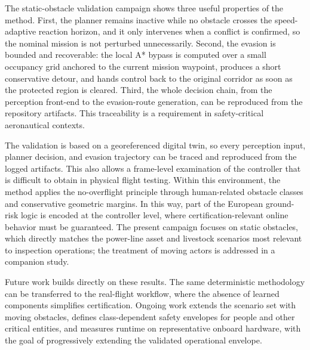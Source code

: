\documentclass[drones,article,submit,moreauthors]{Definitions/mdpi}
\begin{document}
The static-obstacle validation campaign shows three useful properties of the method. First, the planner remains inactive while no obstacle crosses the speed-adaptive reaction horizon, and it only intervenes when a conflict is confirmed, so the nominal mission is not perturbed unnecessarily. Second, the evasion is bounded and recoverable: the local A* bypass is computed over a small occupancy grid anchored to the current mission waypoint, produces a short conservative detour, and hands control back to the original corridor as soon as the protected region is cleared. Third, the whole decision chain, from the perception front-end to the evasion-route generation, can be reproduced from the repository artifacts. This traceability is a requirement in safety-critical aeronautical contexts.

The validation is based on a georeferenced digital twin, so every perception input, planner decision, and evasion trajectory can be traced and reproduced from the logged artifacts. This also allows a frame-level examination of the controller that is difficult to obtain in physical flight testing. Within this environment, the method applies the no-overflight principle through human-related obstacle classes and conservative geometric margins. In this way, part of the European ground-risk logic is encoded at the controller level, where certification-relevant online behavior must be guaranteed. The present campaign focuses on static obstacles, which directly matches the power-line asset and livestock scenarios most relevant to inspection operations; the treatment of moving actors is addressed in a companion study.

Future work builds directly on these results. The same deterministic methodology can be transferred to the real-flight workflow, where the absence of learned components simplifies certification. Ongoing work extends the scenario set with moving obstacles, defines class-dependent safety envelopes for people and other critical entities, and measures runtime on representative onboard hardware, with the goal of progressively extending the validated operational envelope.



\end{document}
